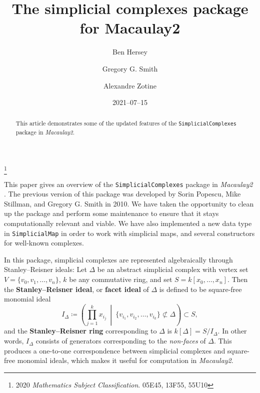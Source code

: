 \documentclass[12pt,leqno]{amsart}
\theoremstyle{definition}
\begin{document}
\title[Simplicial Complexes]{The simplicial complexes package for Macaulay2}

\author[B.~Hersey]{Ben Hersey}
\author[G.G.~Smith]{Gregory G.{} Smith} 
\author[A.~Zotine]{Alexandre Zotine}

\address{Department of Mathematics and Statistics, Queen's
  University, Kingston, Ontario, K7L 3N6;
  {\normalfont\texttt{hersey.b@queensu.ca}},
  {\normalfont\texttt{ggsmith@mast.queensu.ca}},
  {\normalfont\texttt{18az45@queensu.ca}}.
}

\thanks{2020 \emph{Mathematics Subject Classification}. 05E45, 13F55,
  55U10%
}
\date{2021--07--15}

\begin{abstract}
  This article demonstrates some of the updated features of the
  \texttt{SimplicialComplexes} package in \emph{Macaulay2}.
\end{abstract}

\maketitle


\addtocounter{section}{0}
\addtocounter{lemma}{-1}

\noindent
This paper gives an overview of the \texttt{SimplicialComplexes} package in
\emph{Macaulay2} \cite{M2}. The previous version of this package was developed
by Sorin Popescu, Mike Stillman, and Gregory G. Smith in 2010. We have taken
the opportunity to clean up the package and perform some maintenance to ensure
that it stays computationally relevant and viable. We have also implemented a
new data type in \texttt{SimplicialMap} in order to work with simplicial maps,
and several constructors for well-known complexes.

In this package, simplicial complexes are represented algebraically through
Stanley--Reisner ideals: Let $\Delta$ be an abstract simplicial complex with
vertex set $V = \{v_0,v_1,\dotsc,v_n\}$, $k$ be any commutative ring, and set
$S = k[x_0,\dotsc,x_n]$. Then the \textbf{Stanley--Reisner ideal}, or
\textbf{facet ideal} of $\Delta$ is defined to be square-free monomial ideal
%
\[
  I_\Delta \coloneq \left( \prod_{j=1}^k x_{i_j} \ \middle| \ \{
    v_{i_1},v_{i_2},\dotsc,v_{i_k} \} \not \subset \Delta \right) \subset S,
\]
%
and the \textbf{Stanley--Reisner ring} corresponding to $\Delta$ is
$k[\Delta] = S/I_\Delta$. In other words, $I_\Delta$ consists of generators
corresponding to the \textit{non-faces} of $\Delta$. This produces a
one-to-one correspondence between simplicial complexes and square-free
monomial ideals, which makes it useful for computation in \textit{Macaulay2}.
\end{document}
